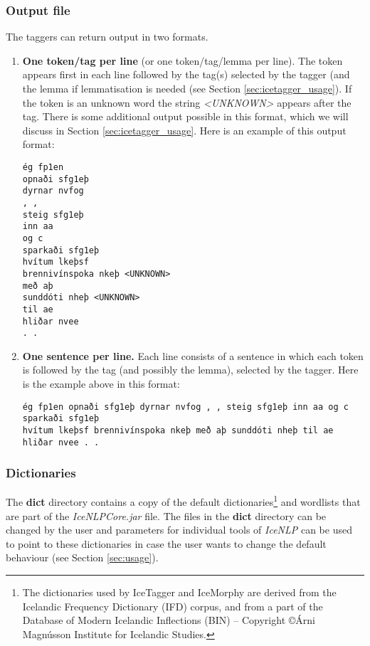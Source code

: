 \documentclass[11pt]{article}
\begin{document}
\subsubsection{Output file}
The taggers can return output in two formats.
\begin{enumerate}
\item {\bf One token/tag per line} (or one token/tag/lemma per line).
The token appears first in each line followed by the tag(s) selected by the tagger (and the lemma if lemmatisation is needed (see Section \ref{sec:icetagger_usage}).
If the token is an unknown word the string \emph{<UNKNOWN>} appears after the tag.
There is some additional output possible in this format, which we will discuss in Section \ref{sec:icetagger_usage}.
Here is an example of this output format:
\begin{verbatim}
ég fp1en
opnaði sfg1eþ
dyrnar nvfog
, ,
steig sfg1eþ
inn aa
og c
sparkaði sfg1eþ
hvítum lkeþsf
brennivínspoka nkeþ <UNKNOWN>
með aþ
sunddóti nheþ <UNKNOWN>
til ae
hliðar nvee
. .
\end{verbatim}

\item {\bf One sentence per line. }
Each line consists of a sentence in which each token is followed by the tag (and possibly the lemma), selected by the tagger.
Here is the example above in this format:
\begin{verbatim}
ég fp1en opnaði sfg1eþ dyrnar nvfog , , steig sfg1eþ inn aa og c sparkaði sfg1eþ
hvítum lkeþsf brennivínspoka nkeþ með aþ sunddóti nheþ til ae hliðar nvee . .
\end{verbatim}
\end{enumerate}

\subsubsection{Dictionaries}
\label{sec:dict}
The {\bf dict} directory contains a copy of the default dictionaries\footnote{The dictionaries used by IceTagger and IceMorphy are derived from the Icelandic Frequency Dictionary (IFD) corpus, and from a part of the Database of Modern Icelandic Inflections (BIN) -- Copyright \copyright Árni Magnússon Institute for Icelandic Studies.} and wordlists that are part of the \emph{IceNLPCore.jar} file. The files in the {\bf dict} directory can be changed by the user and parameters for individual tools of \emph{IceNLP} can be used to point to these dictionaries in case the user wants to change the default behaviour (see Section \ref{sec:usage}).
\end{document}
